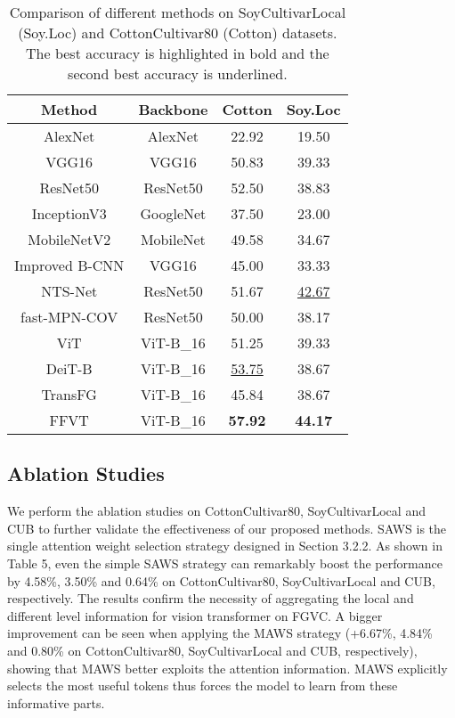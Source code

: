 \documentclass{bmvc2k}
\begin{document}
\begin{table}[!h]
\caption{Comparison of different methods on SoyCultivarLocal (Soy.Loc) and CottonCultivar80 (Cotton) datasets. The best accuracy is highlighted in bold and the second best accuracy is underlined.}
\centering
\begin{tabular}{c|c|c|c}
\toprule  
Method& Backbone& Cotton & Soy.Loc \\
\hline
AlexNet \cite{krizhevsky2012imagenet}&  AlexNet&  22.92 & 19.50\\
VGG16 \cite{simonyan2014very}& VGG16& 50.83 & 39.33 \\
ResNet50 \cite{he2017weakly}& ResNet50 & 52.50 & 38.83\\
InceptionV3 \cite{szegedy2016rethinking}& GoogleNet & 37.50 & 23.00\\
MobileNetV2 \cite{sandler2018mobilenetv2}&  MobileNet & 49.58 & 34.67\\
Improved B-CNN \cite{lin2017improved}&  VGG16 & 45.00 & 33.33\\
NTS-Net \cite{yang2018learning}&  ResNet50 & 51.67 & \underline{42.67}\\
fast-MPN-COV \cite{li2018towards}&  ResNet50 & 50.00 & 38.17\\

\hline
ViT \cite{dosovitskiy2020image}&  ViT-B\_16&  51.25 & 39.33\\
DeiT-B \cite{touvron2020training} & ViT-B\_16 & \underline{53.75} & 38.67 \\
TransFG \cite{he2021transfg}&  ViT-B\_16 &  45.84 & 38.67\\
FFVT&  ViT-B\_16 &  \textbf{57.92} & \textbf{44.17}\\
\bottomrule 
\end{tabular}
\end{table}

\subsection{Ablation Studies}
We perform the ablation studies on CottonCultivar80, SoyCultivarLocal and CUB to further validate the effectiveness of our proposed methods. SAWS is the single attention weight selection strategy designed in Section 3.2.2. As shown in Table 5, even the simple SAWS strategy can remarkably boost the performance by 4.58\%, 3.50\% and 0.64\% on CottonCultivar80, SoyCultivarLocal and CUB, respectively. The results confirm the necessity of aggregating the local and different level information for vision transformer on FGVC. A bigger improvement can be seen when applying the MAWS strategy (+6.67\%, 4.84\% and 0.80\% on CottonCultivar80, SoyCultivarLocal and CUB, respectively), showing that MAWS better exploits the attention information. MAWS explicitly selects the most useful tokens thus forces the model to learn from these informative parts.
\end{document}
